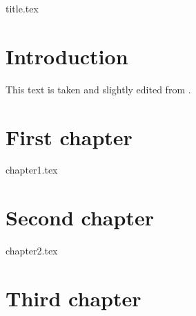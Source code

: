 \documentclass[a4paper,11pt]{book}
\begin{document}
\frontmatter
{title.tex}

\clearpage
\thispagestyle{empty}

\tableofcontents

\mainmatter

\chapter{Introduction}

This text is taken and slightly edited from \textcite{bielefeld}.

\chapter{First chapter}
{chapter1.tex}

\chapter{Second chapter}
{chapter2.tex}

\chapter{Third chapter}


\backmatter

\printbibliography
\end{document}
